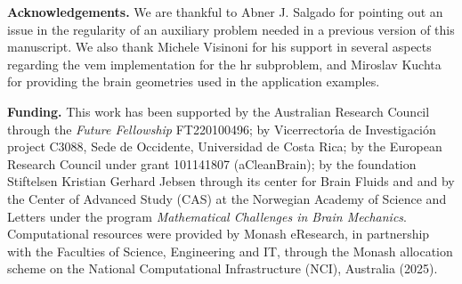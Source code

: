 \documentclass[fleqn,a4paper]{cas-sc}
\newcommand{\0}{\boldsymbol{0}}
\numberwithin{equation}{section}
\numberwithin{figure}{section}
\begin{document}
\bigskip
\noindent\textbf{Acknowledgements.} 
We are thankful to Abner J. Salgado for pointing out an issue in the regularity of an auxiliary problem needed in a previous version of this manuscript. We also thank Michele Visinoni for his support in several aspects regarding the \gls{vem} implementation for the \gls{hr} subproblem, and  Miroslav Kuchta for providing the brain geometries used in the application examples. 

\noindent\textbf{Funding.} This work has been supported by the Australian Research Council through the \textit{Future Fellowship}  FT220100496; by Vicerrector\'{\i}a de Investigaci\'on project C3088, Sede de Occidente, Universidad de Costa Rica; 
by the European Research Council under grant 101141807 (aCleanBrain);  by the foundation Stiftelsen Kristian Gerhard Jebsen through its center for Brain Fluids and
and by  the Center of Advanced Study (CAS) at the Norwegian Academy of Science and Letters under the program \textit{Mathematical Challenges in Brain Mechanics}.  Computational resources were provided by Monash eResearch, in partnership with the Faculties of Science, Engineering and IT, through the Monash allocation scheme on the National Computational Infrastructure (NCI), Australia (2025). 




\end{document}

